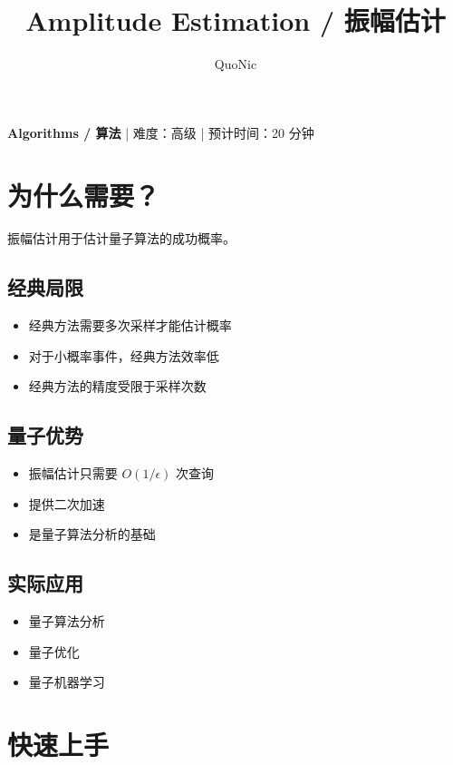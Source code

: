 \documentclass[12pt,a4paper]{article}
\title{Amplitude Estimation / 振幅估计}
\author{QuoNic}
\date{}
\begin{document}
\maketitle

\begin{center}
\textbf{Algorithms / 算法} | 难度：高级 | 预计时间：20 分钟
\end{center}

\tableofcontents
\newpage

\section{为什么需要？}

振幅估计用于估计量子算法的成功概率。

\subsection{经典局限}
\begin{itemize}
  \item 经典方法需要多次采样才能估计概率
  \item 对于小概率事件，经典方法效率低
  \item 经典方法的精度受限于采样次数
\end{itemize}

\subsection{量子优势}
\begin{itemize}
  \item 振幅估计只需要 $O(1/\epsilon)$ 次查询
  \item 提供二次加速
  \item 是量子算法分析的基础
\end{itemize}

\subsection{实际应用}
\begin{itemize}
  \item 量子算法分析
  \item 量子优化
  \item 量子机器学习
\end{itemize}

\section{快速上手}
\end{document}
